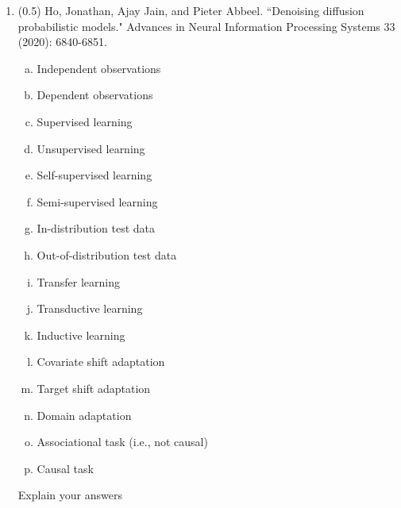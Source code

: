 \documentclass{article}
\begin{document}
\begin{enumerate}
\newpage
\item (0.5) Ho, Jonathan, Ajay Jain, and Pieter Abbeel. ``Denoising diffusion probabilistic models." Advances in Neural Information Processing Systems 33 (2020): 6840-6851.
\begin{enumerate}[(a)]
\item Independent observations
\item Dependent observations
\item Supervised learning
\item Unsupervised learning
\item Self-supervised learning
\item Semi-supervised learning
\item In-distribution test data
\item Out-of-distribution test data
\item Transfer learning
\item Transductive learning
\item Inductive  learning
\item Covariate shift adaptation
\item Target shift adaptation
\item Domain adaptation
\item Associational task (i.e., not causal)
\item Causal task
\end{enumerate}
Explain your answers\\
 \underline{\hspace{6in}}\\
 \underline{\hspace{6in}}\\
 \underline{\hspace{6in}}\\
 \underline{\hspace{6in}}\\
 \underline{\hspace{6in}}\\
 \underline{\hspace{6in}}\\
 \underline{\hspace{6in}}\\
 \underline{\hspace{6in}}\\
 \underline{\hspace{6in}}\\
 \underline{\hspace{6in}}\\
 \underline{\hspace{6in}}\\
 \underline{\hspace{6in}}\\
 \underline{\hspace{6in}}\\
 \underline{\hspace{6in}}\\
 \underline{\hspace{6in}}\\
 

\end{enumerate}
\end{document}

